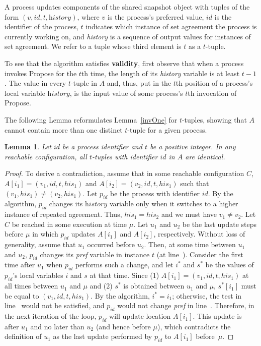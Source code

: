 \documentclass[11pt]{article}
\newtheorem{lemma}[theorem]{Lemma}
\newcounter{linenum}
\newcounter{ind}
\newcommand{\lref}[1]{\linenumref{#1}}
\begin{document}
A process updates components of the shared snapshot object with tuples of the form $(v,id,t,\textit{history})$, where $v$ is the process's preferred value, $id$ is the identifier of the process, 
$t$ indicates which instance of set agreement the process is currently working on,
and \textit{history} is a sequence of output values for instances of set agreement.
We refer to a tuple whose third element is $t$ as a $t$-tuple.

To see that the algorithm satisfies {\bf validity}, first observe
that when a process invokes {\sc Propose} for the $t$th time, the length of its
\textit{history} variable is at least $t-1$.
The value in every $t$-tuple in $A$ and, thus, put in the $t$th position of a 
process's local variable $\textit{history}$, is the input value of some process's $t$th invocation
of {\sc Propose}.

The following Lemma reformulates Lemma~\ref{invOne} for
$t$-tuples, showing that $A$ cannot contain more than one distinct $t$-tuple
for a given process.

\begin{lemma}\label{invOne:rep}
Let $id$ be a process identifier and $t$ be a positive integer. In any reachable configuration,
all $t$-tuples with identifier $id$ in $A$ are identical. 
\end{lemma}

\begin{proof}
To derive a contradiction, assume that in some reachable configuration $C$,
$A[i_1]=(v_1,id,t,his_1)$ and $A[i_2]=(v_2,id,t,his_1)$ such that
$(v_1,his_1)\neq (v_2,his_1)$.
Let $p_{id}$ be the process with identifier $id$.
By the algorithm, $p_{id}$ changes its $\textit{history}$ variable only when it
switches to a higher instance of repeated agreement.  
Thus, $his_1=his_2$ and we must have $v_1\neq v_2$.
Let $C$ be reached in some execution at time $\mu$.
Let $u_1$ and $u_2$ be the last update steps before $\mu$ in which $p_{id}$ updates 
$A[i_1]$ and $A[i_2]$, respectively.
Without loss of generality, assume that $u_1$ occurred before $u_2$.
Then, at some time between $u_1$ and $u_2$, $p_{id}$ changes its
{\it pref} variable in instance $t$ (at line~\lref{change-pref-rep}).  
Consider the first time after $u_1$ when $p_{id}$ performs such a change, and let
$i^*$ and $s^*$ be the values of $p_{id}$'s local variables $i$ and $s$ at
that time. Since (1) $A[i_1]=(v_1,id,t,his_1)$ at all times between $u_1$ and $\mu$ and
(2) $s^*$ is obtained between $u_1$ and $\mu$, $s^*[i_1]$ must be equal
to $(v_1,id,t,his_1)$. By the algorithm, $i^*=i_1$; otherwise, the test in line~\lref{cond-rep} would not be satisfied,
and $p_{id}$ would not change {\it pref} in line~\lref{change-pref-rep}.
Therefore, in the next iteration of the loop, $p_{id}$ will update location $A[i_1]$.
This update is after $u_1$ and no later than $u_2$ (and hence before
$\mu$), which contradicts the definition of $u_1$ as the last update
performed by $p_{id}$ to $A[i_1]$ before~$\mu$.
\end{proof}
\end{document}
